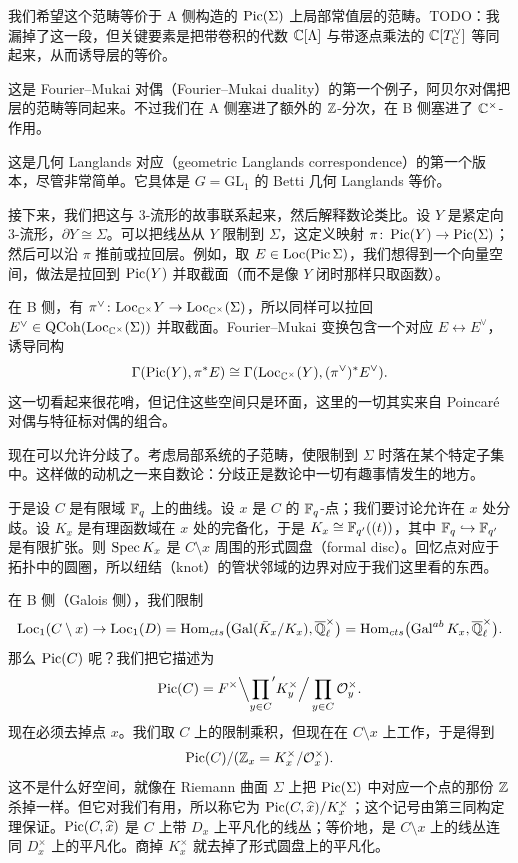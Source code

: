 我们希望这个范畴等价于 A 侧构造的 $\operatorname{Pic}(\Sigma)$ 上局部常值层的范畴。TODO：我漏掉了这一段，但关键要素是把带卷积的代数 $\mathbb{C}[\Lambda]$ 与带逐点乘法的 $\mathbb{C}[T^\vee_{\mathbb{C}}]$ 等同起来，从而诱导层的等价。

这是 Fourier–Mukai 对偶（Fourier–Mukai duality）的第一个例子，阿贝尔对偶把层的范畴等同起来。不过我们在 A 侧塞进了额外的 $\mathbb{Z}$-分次，在 B 侧塞进了 $\mathbb{C}^\times$-作用。

这是几何 Langlands 对应（geometric Langlands correspondence）的第一个版本，尽管非常简单。它具体是 $G=\mathrm{GL}_1$ 的 Betti 几何 Langlands 等价。


接下来，我们把这与 3-流形的故事联系起来，然后解释数论类比。设 $Y$ 是紧定向 3-流形，$\partial Y\cong\Sigma$。可以把线丛从 $Y$ 限制到 $\Sigma$，这定义映射 $\pi\colon\operatorname{Pic}(Y)\to\operatorname{Pic}(\Sigma)$；然后可以沿 $\pi$ 推前或拉回层。例如，取 $E\in\mathrm{Loc}(\operatorname{Pic}\Sigma)$，我们想得到一个向量空间，做法是拉回到 $\operatorname{Pic}(Y)$ 并取截面（而不是像 $Y$ 闭时那样只取函数）。

在 B 侧，有 $\pi^\vee\colon\mathrm{Loc}_{\mathbb{C}^\times}Y\to\mathrm{Loc}_{\mathbb{C}^\times}(\Sigma)$，所以同样可以拉回 $E^\vee\in\mathrm{QCoh}(\mathrm{Loc}_{\mathbb{C}^\times}(\Sigma))$ 并取截面。Fourier–Mukai 变换包含一个对应 $E\leftrightarrow E^\vee$，诱导同构
\[
  \Gamma(\operatorname{Pic}(Y),\pi^*E) \cong \Gamma(\mathrm{Loc}_{\mathbb{C}^\times}(Y),(\pi^\vee)^*E^\vee).
\]
这一切看起来很花哨，但记住这些空间只是环面，这里的一切其实来自 Poincaré 对偶与特征标对偶的组合。

现在可以允许分歧了。考虑局部系统的子范畴，使限制到 $\Sigma$ 时落在某个特定子集中。这样做的动机之一来自数论：分歧正是数论中一切有趣事情发生的地方。

于是设 $C$ 是有限域 $\mathbb{F}_q$ 上的曲线。设 $x$ 是 $C$ 的 $\mathbb{F}_q$-点；我们要讨论允许在 $x$ 处分歧。设 $K_x$ 是有理函数域在 $x$ 处的完备化，于是 $K_x\cong\mathbb{F}_{q'}((t))$，其中 $\mathbb{F}_q\hookrightarrow\mathbb{F}_{q'}$ 是有限扩张。则 $\operatorname{Spec} K_x$ 是 $C\setminus x$ 周围的形式圆盘（formal disc）。回忆点对应于拓扑中的圆圈，所以纽结（knot）的管状邻域的边界对应于我们这里看的东西。

在 B 侧（Galois 侧），我们限制
\[
  \mathrm{Loc}_1(C\setminus x)\to \mathrm{Loc}_1(D) = \operatorname{Hom}_{cts}\bigl(\operatorname{Gal}(\bar{K}_x/K_x),\overline{\mathbb{Q}}_\ell^\times\bigr) = \operatorname{Hom}_{cts}\bigl(\operatorname{Gal}^{ab}K_x,\overline{\mathbb{Q}}_\ell^\times\bigr).
\]
那么 $\operatorname{Pic}(C)$ 呢？我们把它描述为
\[
  \operatorname{Pic}(C) = F^\times\Big\backslash {\prod_{y\in C}}' K_y^\times \Big/ \prod_{y\in C}\mathcal{O}_y^\times.
\]
现在必须去掉点 $x$。我们取 $C$ 上的限制乘积，但现在在 $C\setminus x$ 上工作，于是得到
\[
  \operatorname{Pic}(C)/(\mathbb{Z}_x = K_x^\times/\mathcal{O}_x^\times).
\]
这不是什么好空间，就像在 Riemann 曲面 $\Sigma$ 上把 $\operatorname{Pic}(\Sigma)$ 中对应一个点的那份 $\mathbb{Z}$ 杀掉一样。但它对我们有用，所以称它为 $\operatorname{Pic}(C,\widehat{x})/K_x^\times$；这个记号由第三同构定理保证。$\operatorname{Pic}(C,\widehat{x})$ 是 $C$ 上带 $D_x$ 上平凡化的线丛；等价地，是 $C\setminus x$ 上的线丛连同 $D_x^\times$ 上的平凡化。商掉 $K_x^\times$ 就去掉了形式圆盘上的平凡化。

